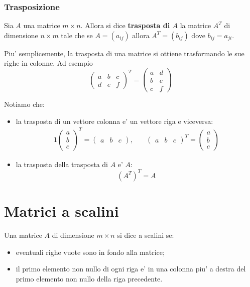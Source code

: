 \subsubsection{Trasposizione}

Sia $A$ una matrice $m \times n$. Allora si dice \textbf{trasposta di $A$} la matrice $A^T$ di dimensione $n \times m$ tale che se $A = (a_{ij})$ allora $A^T = (b_{ij})$ dove $b_{ij} = a_{ji}$. 

Piu' semplicemente, la trasposta di una matrice si ottiene trasformando le sue righe in colonne. Ad esempio
\[
    \begin{pmatrix}
        a & b & c \\ d & e & f 
    \end{pmatrix}^T = \begin{pmatrix}
        a & d \\ b & e \\ c & f
    \end{pmatrix}
\]

Notiamo che:
\begin{itemize}
    \item la trasposta di un vettore colonna e' un vettore riga e viceversa: \begin{alignat*}{1}
        \begin{pmatrix} a \\ b \\ c \end{pmatrix}^T = \begin{pmatrix}
            a & b & c
        \end{pmatrix}, \quad&
        \begin{pmatrix} a & b & c \end{pmatrix}^T = \begin{pmatrix}
            a \\ b \\ c
        \end{pmatrix}
    \end{alignat*}
    \item la trasposta della trasposta di $A$ e' $A$: \[(A^T)^T = A\]
\end{itemize}

\section{Matrici a scalini}

\begin{definition}
    Una matrice $A$ di dimensione $m \times n$ si dice a scalini se:
    \begin{itemize}
        \item eventuali righe vuote sono in fondo alla matrice;
        \item il primo elemento non nullo di ogni riga e' in una colonna piu' a destra del primo elemento non nullo della riga precedente.
    \end{itemize}
\end{definition}

